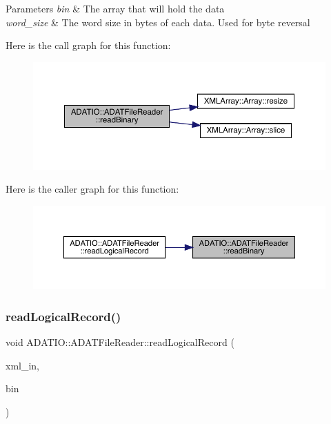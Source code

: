 \begin{DoxyParams}{Parameters}
{\em bin} & The array that will hold the data \\
\hline
{\em word\+\_\+size} & The word size in bytes of each data. Used for byte reversal \\
\hline
\end{DoxyParams}
Here is the call graph for this function\+:
\nopagebreak
\begin{figure}[H]
\begin{center}
\leavevmode
\includegraphics[width=350pt]{db/de5/group__qio_ga40b41bda2b27ce68a0ac0ee28124fc64_cgraph}
\end{center}
\end{figure}
Here is the caller graph for this function\+:
\nopagebreak
\begin{figure}[H]
\begin{center}
\leavevmode
\includegraphics[width=350pt]{db/de5/group__qio_ga40b41bda2b27ce68a0ac0ee28124fc64_icgraph}
\end{center}
\end{figure}
\mbox{\label{group__qio_ga7d36d6dd7fef90986d0c435ddaa86eae}} 
\subsubsection{\texorpdfstring{readLogicalRecord()}{readLogicalRecord()}}
{\footnotesize\ttfamily void A\+D\+A\+T\+I\+O\+::\+A\+D\+A\+T\+File\+Reader\+::read\+Logical\+Record (\begin{DoxyParamCaption}\item[{\mbox{\hyperlink{classADATXML_1_1XMLReader}{X\+M\+L\+Reader}} \&}]{xml\+\_\+in,  }\item[{\mbox{\hyperlink{classXMLArray_1_1Array}{Array}}$<$ char $>$ \&}]{bin }\end{DoxyParamCaption})\hspace{0.3cm}{\ttfamily [protected]}}



